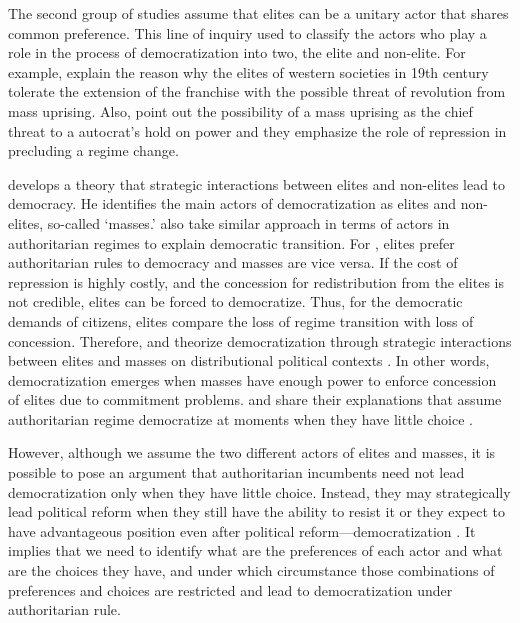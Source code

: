 \documentclass[11pt]{article}
\begin{document}
The second group of studies assume that elites can be a unitary actor that shares common preference. This line of inquiry used to classify the actors who play a role in the process of democratization into two, the elite and non-elite. For example, \citet{Acemoglu2000} explain the reason why the elites of western societies in 19th century tolerate the extension of the franchise with the possible threat of revolution from mass uprising. Also, \citet{Acemoglu2001} point out the possibility of a mass uprising as the chief threat to a autocrat's hold on power and they emphasize the role of repression in precluding a regime change.

\citet{Boix2003} develops a theory that strategic interactions between elites and non-elites lead to democracy. He identifies the main actors of democratization as elites and non-elites, so-called `masses.' \citet{Acemoglu2006a} also take similar approach in terms of actors in authoritarian regimes to explain democratic transition. For \citet{Acemoglu2006a}, elites prefer authoritarian rules to democracy and masses are vice versa. If the cost of repression is highly costly, and the concession for redistribution from the elites is not credible, elites can be forced to democratize. Thus, for the democratic demands of citizens, elites compare the loss of regime transition with loss of concession. Therefore, \citet{Boix2003} and \citet{Acemoglu2006a} theorize democratization through strategic interactions between elites and masses on distributional political contexts \citep{Haggard2012a}. In other words, democratization emerges when masses have enough power to enforce concession of elites due to commitment problems. \citet{Boix2003} and \citet{Acemoglu2006a} share their explanations that assume authoritarian regime democratize at moments when they have little
choice \citep{Riedl2020}.

However, although we assume the two different actors of elites and masses, it is possible to pose an argument that authoritarian incumbents need not lead democratization only when they have little choice. Instead, they may strategically lead political reform when they still have the ability to resist it \citep{Riedl2020} or they expect to have advantageous position  even after political reform---democratization \citep{Albertus2017}. It implies that we need to identify what are the preferences of each actor and what are the choices they have, and under which circumstance those combinations of preferences and choices are restricted and lead to democratization under authoritarian rule.
\end{document}
